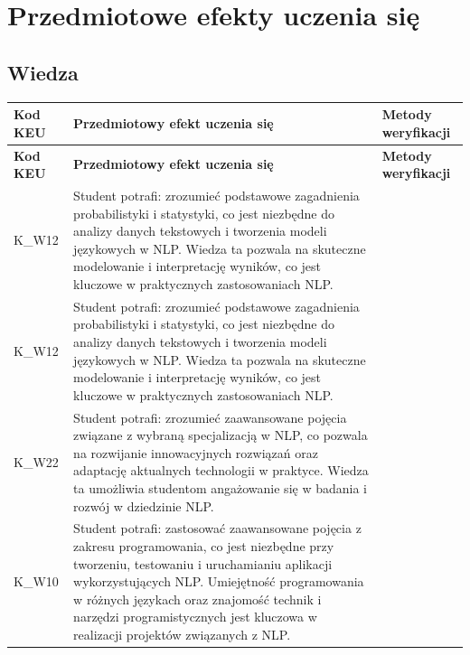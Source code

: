 \documentclass[12pt, a4paper]{article}
\newcommand{\thdrule}{\noalign{\global\setlength{\extrarowheight}{0pt}}}
\newcommand{\thdend}{\noalign{\global\setlength{\extrarowheight}{3pt}}}
\begin{document}
\section{Przedmiotowe efekty uczenia się}

\subsection*{Wiedza}
{\scriptsize
\begin{longtable}{m{1.6cm}m{9.0cm}m{4.2cm}}
\thdrule\toprule
\rowcolor{pjatkRed} {\color{white}\footnotesize\textbf{\vphantom{Ag}Kod KEU}} & {\color{white}\footnotesize\textbf{\vphantom{Ag}Przedmiotowy efekt uczenia się}} & {\color{white}\footnotesize\textbf{\vphantom{Ag}Metody weryfikacji}} \\
\midrule\thdend
\endfirsthead
\thdrule\toprule
\rowcolor{pjatkRed} {\color{white}\footnotesize\textbf{\vphantom{Ag}Kod KEU}} & {\color{white}\footnotesize\textbf{\vphantom{Ag}Przedmiotowy efekt uczenia się}} & {\color{white}\footnotesize\textbf{\vphantom{Ag}Metody weryfikacji}} \\
\midrule\thdend
\endhead
  \rowcolor{tableRowLight} K\_W12 & Student potrafi: zrozumieć podstawowe zagadnienia probabilistyki i statystyki, co jest niezbędne do analizy danych tekstowych i tworzenia modeli językowych w NLP. Wiedza ta pozwala na skuteczne modelowanie i interpretację wyników, co jest kluczowe w praktycznych zastosowaniach NLP. &  \\
  \rowcolor{tableRowAlt} K\_W12 & Student potrafi: zrozumieć podstawowe zagadnienia probabilistyki i statystyki, co jest niezbędne do analizy danych tekstowych i tworzenia modeli językowych w NLP. Wiedza ta pozwala na skuteczne modelowanie i interpretację wyników, co jest kluczowe w praktycznych zastosowaniach NLP. &  \\
  \rowcolor{tableRowLight} K\_W22 & Student potrafi: zrozumieć zaawansowane pojęcia związane z wybraną specjalizacją w NLP, co pozwala na rozwijanie innowacyjnych rozwiązań oraz adaptację aktualnych technologii w praktyce. Wiedza ta umożliwia studentom angażowanie się w badania i rozwój w dziedzinie NLP. &  \\
  \rowcolor{tableRowAlt} K\_W10 & Student potrafi: zastosować zaawansowane pojęcia z zakresu programowania, co jest niezbędne przy tworzeniu, testowaniu i uruchamianiu aplikacji wykorzystujących NLP. Umiejętność programowania w różnych językach oraz znajomość technik i narzędzi programistycznych jest kluczowa w realizacji projektów związanych z NLP. &  \\
\bottomrule
\end{longtable}}
\end{document}
